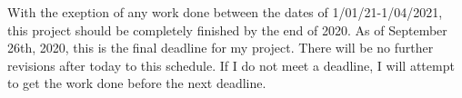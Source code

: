 \documentclass[a4paper,10pt]{article}
\begin{document}
With the exeption of any work done between the dates of 1/01/21-1/04/2021, this project should be completely finished by the end of 2020. As of September 26th, 2020, this is the final deadline for my project. There will be no further revisions after today to this schedule. If I do not meet a deadline, I will attempt to get the work done before the next deadline.
\end{document}

